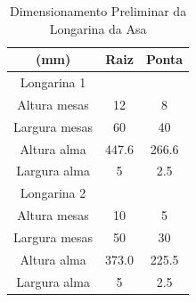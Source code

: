 \begin{table}[H]
\centering
\begin{tabular}{ccc}
\toprule
(mm) & Raiz & Ponta \\ \midrule
Longarina 1 &  &   \\ \midrule
Altura mesas & 12 & 8 \\
Largura mesas & 60 & 40\\
Altura alma & 447.6 & 266.6 \\
Largura alma & 5 & 2.5 \\ \midrule
Longarina 2 &  &   \\ \midrule
Altura mesas & 10 & 5 \\
Largura mesas & 50 & 30 \\
Altura alma & 373.0 & 225.5 \\
Largura alma & 5 & 2.5 \\
\bottomrule
\end{tabular}
\caption{Dimensionamento Preliminar da Longarina da Asa}
\label{tbl:longarinas}
\end{table}
